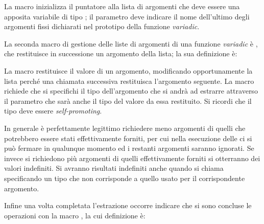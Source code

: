 {\centering
\begin{funcbox}{ 
}
\end{funcbox}}

La macro inizializza il puntatore alla lista di argomenti  che deve
essere una apposita variabile di tipo ; il
parametro  deve indicare il nome dell'ultimo degli argomenti fissi
dichiarati nel prototipo della funzione \textit{variadic}.


La seconda macro di gestione delle liste di argomenti di una funzione
\textit{variadic} è , che restituisce in successione un
argomento della lista; la sua definizione è:

{\centering
\begin{funcbox}{ 
}
\end{funcbox}}
 
La macro restituisce il valore di un argomento, modificando opportunamente la
lista  perché una chiamata successiva restituisca l'argomento
seguente. La macro richiede che si specifichi il tipo dell'argomento che si
andrà ad estrarre attraverso il parametro  che sarà anche il tipo
del valore da essa restituito. Si ricordi che il tipo deve essere
\textit{self-promoting}.

In generale è perfettamente legittimo richiedere meno argomenti di quelli che
potrebbero essere stati effettivamente forniti, per cui nella esecuzione delle
 ci si può fermare in qualunque momento ed i restanti argomenti
saranno ignorati. Se invece si richiedono più argomenti di quelli
effettivamente forniti si otterranno dei valori indefiniti. Si avranno
risultati indefiniti anche quando si chiama  specificando un
tipo che non corrisponde a quello usato per il corrispondente argomento.


Infine una volta completata l'estrazione occorre indicare che si sono concluse
le operazioni con la macro , la cui definizione è:

{\centering
\begin{funcbox}{ 
}
\end{funcbox}}
 
